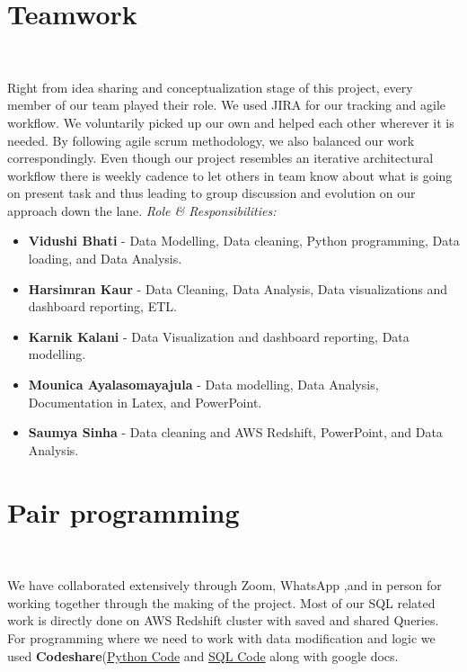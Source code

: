 \documentclass[11pt,journal,compsoc]{IEEEtran}
\begin{document}
\section{Teamwork}\ 

Right from idea sharing and conceptualization stage of this project, every member of our team played their role. We used JIRA for our tracking and agile workflow. We voluntarily picked up our own and helped each other wherever it is needed. By following agile scrum methodology, we also balanced our work correspondingly. Even though our project resembles an iterative architectural workflow there is weekly cadence to let others in team know about what is going on present task and thus leading to group discussion and evolution on our approach down the lane.
\textit{Role \& Responsibilities:}
\begin{itemize}
    \item \textbf{Vidushi Bhati} - Data Modelling, Data cleaning, Python programming, Data loading, and Data Analysis. 
    \item \textbf{Harsimran Kaur} - Data Cleaning, Data Analysis, Data visualizations and dashboard reporting, ETL.
    \item \textbf{Karnik Kalani} - Data Visualization and dashboard reporting, Data modelling.
    \item \textbf{Mounica Ayalasomayajula} - Data modelling, Data Analysis, Documentation in Latex, and PowerPoint.
    \item \textbf{Saumya Sinha} - Data cleaning and AWS Redshift, PowerPoint, and Data Analysis.
\end{itemize}
\section{Pair programming}\ 

We have collaborated extensively through Zoom, WhatsApp ,and in person for working together through the making of the project. Most of our SQL related work is directly done on AWS Redshift cluster with saved and shared Queries. For programming where we need to work with data modification and logic we used \textbf{Codeshare}(\href{https://codeshare.io/3Azd7v}{Python Code} and \href{https://codeshare.io/dwN1PM}{SQL Code} along with google docs.
\end{document}
